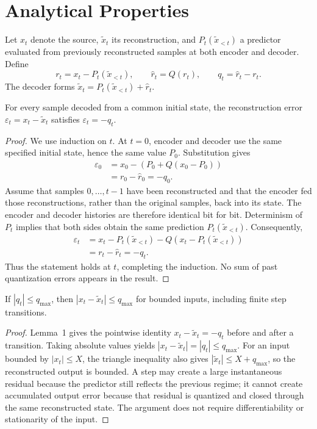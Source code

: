 \section{Analytical Properties}

Let $x_t$ denote the source, $\widetilde{x}_t$ its reconstruction, and $P_t(\widetilde{x}_{<t})$ a predictor evaluated from previously reconstructed samples at both encoder and decoder. Define
\begin{equation}
 r_t=x_t-P_t(\widetilde{x}_{<t}),\qquad
 \widehat r_t=Q(r_t),\qquad q_t=\widehat r_t-r_t.
\end{equation}
The decoder forms $\widetilde{x}_t=P_t(\widetilde{x}_{<t})+\widehat r_t$.

\begin{lemma}
For every sample decoded from a common initial state, the reconstruction error $\varepsilon_t=x_t-\widetilde{x}_t$ satisfies $\varepsilon_t=-q_t$.
\end{lemma}
\begin{proof}
We use induction on $t$. At $t=0$, encoder and decoder use the same specified initial state, hence the same value $P_0$. Substitution gives
\begin{align}
 \varepsilon_0
 &=x_0-\left(P_0+Q(x_0-P_0)\right)\\
 &=r_0-\widehat r_0=-q_0.
\end{align}
Assume that samples $0,\ldots,t-1$ have been reconstructed and that the encoder fed those reconstructions, rather than the original samples, back into its state. The encoder and decoder histories are therefore identical bit for bit. Determinism of $P_t$ implies that both sides obtain the same prediction $P_t(\widetilde{x}_{<t})$. Consequently,
\begin{align}
 \varepsilon_t
 &=x_t-P_t(\widetilde{x}_{<t})-Q\!\left(x_t-P_t(\widetilde{x}_{<t})\right)\\
 &=r_t-\widehat r_t=-q_t.
\end{align}
Thus the statement holds at $t$, completing the induction. No sum of past quantization errors appears in the result.
\end{proof}

\begin{lemma}
If $|q_t|\leq q_{\max}$, then $|x_t-\widetilde{x}_t|\leq q_{\max}$ for bounded inputs, including finite step transitions.
\end{lemma}
\begin{proof}
Lemma~1 gives the pointwise identity $x_t-\widetilde{x}_t=-q_t$ before and after a transition. Taking absolute values yields
$|x_t-\widetilde{x}_t|=|q_t|\leq q_{\max}$.
For an input bounded by $|x_t|\leq X$, the triangle inequality also gives
$|\widetilde{x}_t|\leq X+q_{\max}$, so the reconstructed output is bounded. A step may create a large instantaneous residual because the predictor still reflects the previous regime; it cannot create accumulated output error because that residual is quantized and closed through the same reconstructed state. The argument does not require differentiability or stationarity of the input.
\end{proof}

